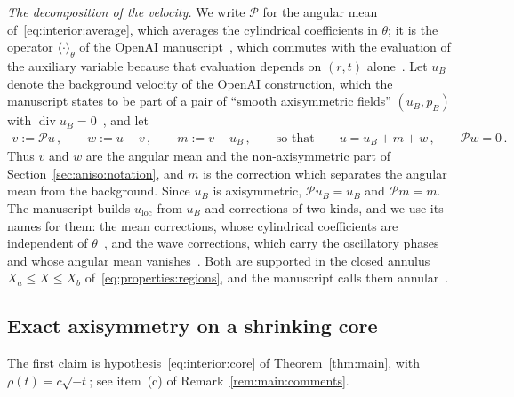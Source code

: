 \documentclass[11pt,reqno]{amsproc}
\numberwithin{equation}{section}
\theoremstyle{remark}
\renewcommand{\div}{\operatorname{div}}
\begin{document}
\smallskip
\noindent\emph{The decomposition of the velocity.} We write $\mathcal P$ for the angular mean of~\eqref{eq:interior:average}, which averages the cylindrical coefficients in $\theta$; it is the operator $\langle\cdot\rangle_\theta$ of the OpenAI manuscript~\cite[equation~(3.7), p.~17]{OpenAIManuscript}, which commutes with the evaluation of the auxiliary variable because that evaluation depends on $(r,t)$ alone~\cite[equation~(6.3), p.~63, and p.~117]{OpenAIManuscript}. Let $u_B$ denote the background velocity of the OpenAI construction, which the manuscript states to be part of a pair of ``smooth axisymmetric fields'' $(u_B,p_B)$ with $\div u_B=0$~\cite[Proposition~5.5, p.~60]{OpenAIManuscript}, and let
\begin{align}
v:=\mathcal Pu
\,,\qquad
w:=u-v
\,,\qquad
m:=v-u_B
\,,\qquad\mbox{so that}\qquad
u=u_B+m+w
\,,\qquad
\mathcal Pw=0
\,.
\label{eq:properties:decomposition}
\end{align}
Thus $v$ and $w$ are the angular mean and the non-axisymmetric part of Section~\ref{sec:aniso:notation}, and $m$ is the correction which separates the angular mean from the background. Since $u_B$ is axisymmetric, $\mathcal Pu_B=u_B$ and $\mathcal Pm=m$. The manuscript builds $u_{\mathrm{loc}}$ from $u_B$ and corrections of two kinds, and we use its names for them: the mean corrections, whose cylindrical coefficients are independent of $\theta$~\cite[Definition~6.4, p.~69]{OpenAIManuscript}, and the wave corrections, which carry the oscillatory phases~\cite[equation~(6.27) and Definition~6.5, p.~70]{OpenAIManuscript} and whose angular mean vanishes~\cite[equation~(9.7), p.~106]{OpenAIManuscript}. Both are supported in the closed annulus $X_a\le X\le X_b$ of~\eqref{eq:properties:regions}, and the manuscript calls them annular~\cite[pp.~115 and~117]{OpenAIManuscript}.

\subsection{Exact axisymmetry on a shrinking core}
\label{sec:properties:structure}

The first claim is hypothesis~\eqref{eq:interior:core} of Theorem~\ref{thm:main}, with $\rho(t)=c\sqrt{-t}$; see item~(c) of Remark~\ref{rem:main:comments}.
\end{document}

